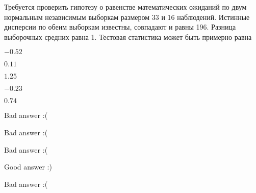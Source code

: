 
\begin{question}
Требуется проверить гипотезу о равенстве математических ожиданий по двум
нормальным независимым выборкам размером 33 и 16 наблюдений. Истинные
дисперсии по обеим выборкам известны, совпадают и равны 196. Разница
выборочных средних равна 1. Тестовая статистика может быть примерно равна
\begin{answerlist}
  \item \(-0.52\)
  \item \(0.11\)
  \item \(1.25\)
  \item \(-0.23\)
  \item \(0.74\)
\end{answerlist}
\end{question}

\begin{solution}
\begin{answerlist}
  \item Bad answer :(
  \item Bad answer :(
  \item Bad answer :(
  \item Good answer :)
  \item Bad answer :(
\end{answerlist}
\end{solution}

